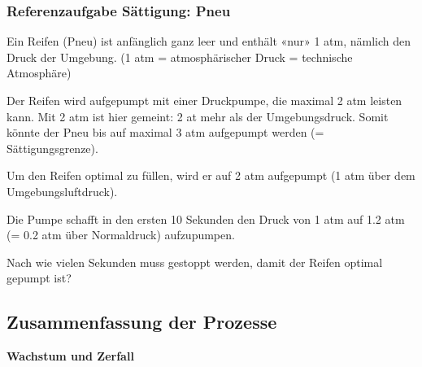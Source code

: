 \subsubsection{Referenzaufgabe Sättigung: Pneu}

Ein Reifen (Pneu) ist anfänglich ganz leer und enthält «nur» 1 atm, nämlich den
Druck der Umgebung. (1 atm = atmosphärischer Druck = technische Atmosphäre) 

Der Reifen wird aufgepumpt mit einer Druckpumpe, die maximal 2 atm
leisten
kann. Mit 2 atm ist hier gemeint: 2 at mehr als der
Umgebungsdruck. Somit könnte der Pneu bis auf maximal 3 atm aufgepumpt
werden (= Sättigungsgrenze).

Um den Reifen optimal zu füllen, wird er auf 2 atm aufgepumpt (1 atm
über dem Umgebungsluftdruck).

Die Pumpe schafft in den ersten 10 Sekunden den Druck von 1 atm auf 1.2
atm (= 0.2 atm über Normaldruck) aufzupumpen.

Nach wie vielen Sekunden muss gestoppt werden, damit der Reifen
optimal gepumpt ist?

\newpage



\newpage

\subsection{Zusammenfassung der Prozesse}
\vspace{8mm}
\begin{center}\textbf{Wachstum und Zerfall}\end{center}

